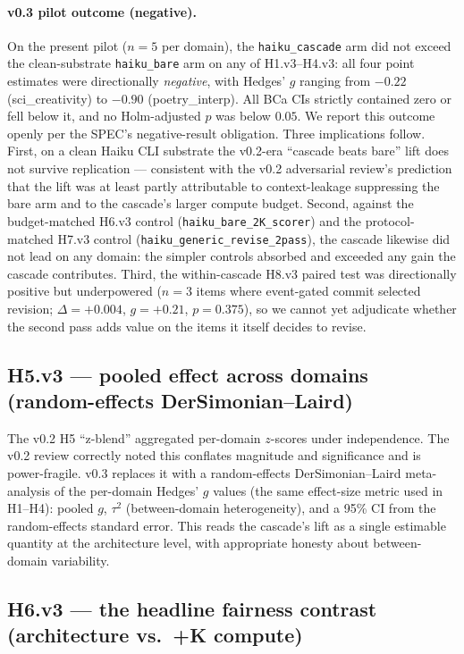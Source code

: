 \paragraph{v0.3 pilot outcome (negative).} On the present pilot ($n{=}5$ per domain), the \texttt{haiku\_cascade} arm did not exceed the clean-substrate \texttt{haiku\_bare} arm on any of H1.v3--H4.v3: all four point estimates were directionally \emph{negative}, with Hedges' $g$ ranging from $-0.22$ (sci\_creativity) to $-0.90$ (poetry\_interp). All BCa CIs strictly contained zero or fell below it, and no Holm-adjusted $p$ was below $0.05$. We report this outcome openly per the SPEC's negative-result obligation. Three implications follow. First, on a clean Haiku CLI substrate the v0.2-era ``cascade beats bare'' lift does not survive replication --- consistent with the v0.2 adversarial review's prediction that the lift was at least partly attributable to context-leakage suppressing the bare arm and to the cascade's larger compute budget. Second, against the budget-matched H6.v3 control (\texttt{haiku\_bare\_2K\_scorer}) and the protocol-matched H7.v3 control (\texttt{haiku\_generic\_revise\_2pass}), the cascade likewise did not lead on any domain: the simpler controls absorbed and exceeded any gain the cascade contributes. Third, the within-cascade H8.v3 paired test was directionally positive but underpowered ($n{=}3$ items where event-gated commit selected revision; $\Delta=+0.004$, $g=+0.21$, $p=0.375$), so we cannot yet adjudicate whether the second pass adds value on the items it itself decides to revise.

\subsection{H5.v3 --- pooled effect across domains (random-effects DerSimonian--Laird)}

The v0.2 H5 ``z-blend'' aggregated per-domain $z$-scores under independence. The v0.2 review correctly noted this conflates magnitude and significance and is power-fragile. v0.3 replaces it with a random-effects DerSimonian--Laird meta-analysis of the per-domain Hedges' $g$ values (the same effect-size metric used in H1--H4): pooled $g$, $\tau^2$ (between-domain heterogeneity), and a 95\% CI from the random-effects standard error. This reads the cascade's lift as a single estimable quantity at the architecture level, with appropriate honesty about between-domain variability.

\subsection{H6.v3 --- the headline fairness contrast (architecture vs.\ +K compute)}

